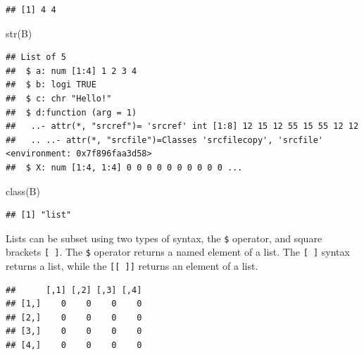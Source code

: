 \documentclass[
]{book}
\newenvironment{Shaded}{\begin{snugshade}}{\end{snugshade}}
\newcommand{\CommentTok}[1]{\textcolor[rgb]{0.56,0.35,0.01}{\textit{#1}}}
\newcommand{\FunctionTok}[1]{\textcolor[rgb]{0.00,0.00,0.00}{#1}}
\newcommand{\NormalTok}[1]{#1}
\newcommand{\SpecialCharTok}[1]{\textcolor[rgb]{0.00,0.00,0.00}{#1}}
\begin{document}
\begin{Shaded}
\end{Shaded}

\begin{verbatim}
## [1] 4 4
\end{verbatim}

\begin{Shaded}
\begin{Highlighting}[]
\FunctionTok{str}\NormalTok{(B)}
\end{Highlighting}
\end{Shaded}

\begin{verbatim}
## List of 5
##  $ a: num [1:4] 1 2 3 4
##  $ b: logi TRUE
##  $ c: chr "Hello!"
##  $ d:function (arg = 1)  
##   ..- attr(*, "srcref")= 'srcref' int [1:8] 12 15 12 55 15 55 12 12
##   .. ..- attr(*, "srcfile")=Classes 'srcfilecopy', 'srcfile' <environment: 0x7f896faa3d58> 
##  $ X: num [1:4, 1:4] 0 0 0 0 0 0 0 0 0 0 ...
\end{verbatim}

\begin{Shaded}
\begin{Highlighting}[]
\FunctionTok{class}\NormalTok{(B)}
\end{Highlighting}
\end{Shaded}

\begin{verbatim}
## [1] "list"
\end{verbatim}

Lists can be subset using two types of syntax, the \texttt{\$} operator, and square brackets \texttt{{[}\ {]}}. The \texttt{\$} operator returns a named element of a list. The \texttt{{[}\ {]}} syntax returns a list, while the \texttt{{[}{[}\ {]}{]}} returns an element of a list.

\begin{Shaded}
\end{Shaded}

\begin{verbatim}
##      [,1] [,2] [,3] [,4]
## [1,]    0    0    0    0
## [2,]    0    0    0    0
## [3,]    0    0    0    0
## [4,]    0    0    0    0
\end{verbatim}
\end{document}
